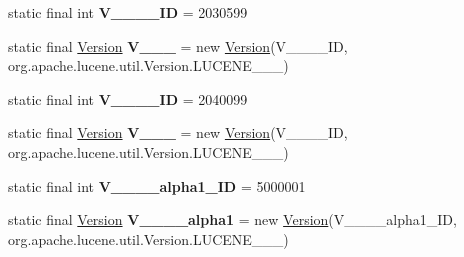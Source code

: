 \begin{DoxyCompactItemize}
\item 
\hypertarget{classorg_1_1elasticsearch_1_1_version_a42b09c5c3f7b00ef0b7ce3e7f7567f02}{}\label{classorg_1_1elasticsearch_1_1_version_a42b09c5c3f7b00ef0b7ce3e7f7567f02} 
static final int {\bfseries V\+\_\+\_\+\_\+\_\+\+ID} = 2030599
\item 
\hypertarget{classorg_1_1elasticsearch_1_1_version_a22dab042fe8bc6d324bf00da4f952327}{}\label{classorg_1_1elasticsearch_1_1_version_a22dab042fe8bc6d324bf00da4f952327} 
static final \hyperlink{classorg_1_1elasticsearch_1_1_version}{Version} {\bfseries V\+\_\+\_\+\_} = new \hyperlink{classorg_1_1elasticsearch_1_1_version}{Version}(V\+\_\+\_\+\_\+\_\+\+ID, org.\+apache.\+lucene.\+util.\+Version.\+L\+U\+C\+E\+N\+E\+\_\+\_\+\_)
\item 
\hypertarget{classorg_1_1elasticsearch_1_1_version_a6306f181cb77be8842e1b3a56d4b4d6c}{}\label{classorg_1_1elasticsearch_1_1_version_a6306f181cb77be8842e1b3a56d4b4d6c} 
static final int {\bfseries V\+\_\+\_\+\_\+\_\+\+ID} = 2040099
\item 
\hypertarget{classorg_1_1elasticsearch_1_1_version_a7a984eed79e4f3e173c75fd152adf6a5}{}\label{classorg_1_1elasticsearch_1_1_version_a7a984eed79e4f3e173c75fd152adf6a5} 
static final \hyperlink{classorg_1_1elasticsearch_1_1_version}{Version} {\bfseries V\+\_\+\_\+\_} = new \hyperlink{classorg_1_1elasticsearch_1_1_version}{Version}(V\+\_\+\_\+\_\+\_\+\+ID, org.\+apache.\+lucene.\+util.\+Version.\+L\+U\+C\+E\+N\+E\+\_\+\_\+\_)
\item 
\hypertarget{classorg_1_1elasticsearch_1_1_version_aca3c4817a3fb4900dd9a16dd97d988bc}{}\label{classorg_1_1elasticsearch_1_1_version_aca3c4817a3fb4900dd9a16dd97d988bc} 
static final int {\bfseries V\+\_\+\_\+\_\+\_\+alpha1\+\_\+\+ID} = 5000001
\item 
\hypertarget{classorg_1_1elasticsearch_1_1_version_a93ccc0fb4e5c52788f4b04db6f9d9294}{}\label{classorg_1_1elasticsearch_1_1_version_a93ccc0fb4e5c52788f4b04db6f9d9294} 
static final \hyperlink{classorg_1_1elasticsearch_1_1_version}{Version} {\bfseries V\+\_\+\_\+\_\+\_\+alpha1} = new \hyperlink{classorg_1_1elasticsearch_1_1_version}{Version}(V\+\_\+\_\+\_\+\_\+alpha1\+\_\+\+ID, org.\+apache.\+lucene.\+util.\+Version.\+L\+U\+C\+E\+N\+E\+\_\+\_\+\_)
\item 
\hypertarget{classorg_1_1elasticsearch_1_1_version_a985875efc04b9bd57021dfc660aede9b}{}\label{classorg_1_1elasticsearch_1_1_version_a985875efc04b9bd57021dfc660aede9b} 

\end{DoxyCompactItemize}

